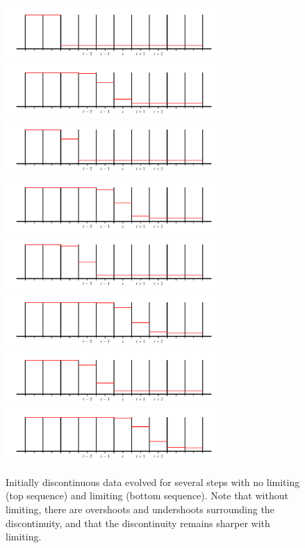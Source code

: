 \begin{figure}[p!]
\vskip 0.5in
\includegraphics[width=3.25in]{rea-start_001}\hspace{1em}
\includegraphics[width=3.25in]{rea-start_005} \\
\includegraphics[width=3.25in]{rea-start_002}\hspace{1em}
\includegraphics[width=3.25in]{rea-start_006} \\
\includegraphics[width=3.25in]{rea-start_003}\hspace{1em}
\includegraphics[width=3.25in]{rea-start_007} \\
\includegraphics[width=3.25in]{rea-start_004}\hspace{1em}
\includegraphics[width=3.25in]{rea-start_008} \\
\caption[The effect of limiters on initially discontinuous data.]{\label{fig:limitingex}Initially discontinuous data evolved for several steps with
  no limiting (top sequence) and limiting (bottom sequence).  Note
  that without limiting, there are overshoots and undershoots
  surrounding the discontinuity, and that the discontinuity remains
  sharper with limiting.}
\clearpage
\end{figure}


